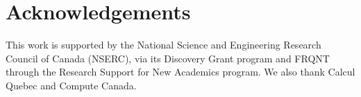 \documentclass[twocolumn,final,10pt]{elsarticle}
\begin{document}
\section*{Acknowledgements}
This work is supported by the National Science and Engineering Research Council of Canada (NSERC), via its Discovery Grant program and FRQNT through the Research Support for New Academics program. We also thank Calcul Quebec and Compute Canada.



\end{document}
